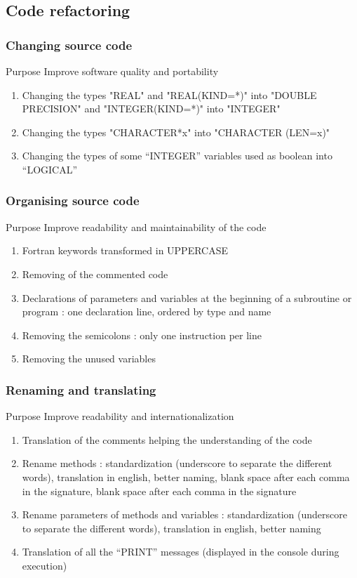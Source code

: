 \documentclass[10p]{beamer}
\begin{document}
\subsection{Code refactoring}
\begin{frame}
\frametitle{Changing source code}
\begin{block}{Purpose}
Improve software quality and portability
\end{block}
\begin{enumerate}
\item Changing the types "REAL" and "REAL(KIND=*)" into "DOUBLE PRECISION" and "INTEGER(KIND=*)" into "INTEGER"
\item Changing the types "CHARACTER*x" into "CHARACTER (LEN=x)"
\item Changing the types of some “INTEGER” variables used as boolean into “LOGICAL”
\end{enumerate}
\end{frame}
\begin{frame}
\frametitle{Organising source code}
\begin{block}{Purpose}
Improve readability and maintainability of the code
\end{block}
\begin{enumerate}
\item Fortran keywords transformed in UPPERCASE
\item Removing of the commented code
\item Declarations of parameters and variables at the beginning of a subroutine or program : one declaration line, ordered by type and name
\item Removing the semicolons : only one instruction per line
\item Removing the unused variables
\end{enumerate}
\end{frame}
\begin{frame}
\frametitle{Renaming and translating}
\begin{block}{Purpose}
Improve readability and internationalization
\end{block}
\begin{enumerate}
\item Translation of the comments helping the understanding of the code
\item Rename methods : standardization (underscore to separate the different words), translation in english, better naming, blank space after each comma in the signature, blank space after each comma in the signature
\item Rename parameters of methods and variables : standardization (underscore to separate the different words), translation in english, better naming
\item Translation of all the “PRINT” messages (displayed in the console during execution)
\end{enumerate}
\end{frame}
\end{document}
